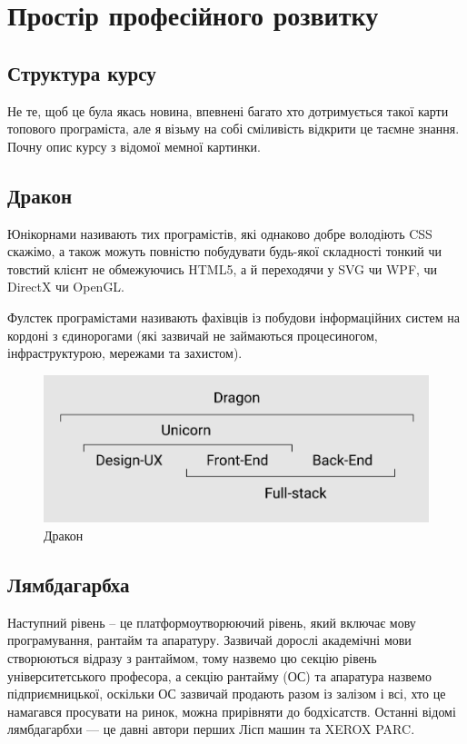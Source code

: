 \section{Простір професійного розвитку}

\subsection{Структура курсу}

Не те, щоб це була якась новина, впевнені багато
хто дотримується такої карти топового програміста,
але я візьму на собі сміливість відкрити це таємне
знання. Почну опис курсу з відомої мемної картинки.


\subsection{Дракон}

Юнікорнами називають тих програмістів, які однаково
добре володіють CSS скажімо, а також можуть повністю
побудувати будь-якої складності тонкий чи товстий
клієнт не обмежуючись HTML5, а й переходячи у SVG
чи WPF, чи DirectX чи OpenGL.

Фулстек програмістами називають фахівців із
побудови інформаційних систем на кордоні з
єдинорогами (які зазвичай не займаються процесиногом,
інфраструктурою, мережами та захистом).

\begin{figure}[!htbp]
\centerline{\includegraphics[scale=0.35]{dragon.PNG}}
\caption{Дракон}
\end{figure}

\subsection{Лямбдагарбха}

Наступний рівень -- це платформоутворюючий рівень,
який включає мову програмування, рантайм та апаратуру.
Зазвичай дорослі академічні мови створюються відразу з
рантаймом, тому назвемо цю секцію рівень університетського
професора, а секцію рантайму (ОС) та апаратура назвемо
підприємницької, оскільки ОС зазвичай продають разом
із залізом і всі, хто це намагався просувати на ринок,
можна прирівняти до бодхісатств. Останні відомі лямбдагарбхи ---
це давні автори перших Лісп машин та XEROX PARC.

